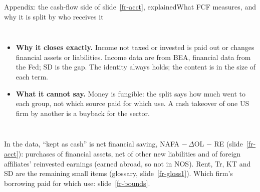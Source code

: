 \documentclass[aspectratio=169,10pt,t]{beamer}
\newcommand{\src}[1]{\vfill{\tiny\textcolor{muted}{#1}\par}\vspace{0.04cm}}
\newcommand{\slref}[1]{slide~\ref{#1}}
\begin{document}
\begin{frame}[label=xcash]{Appendix: the cash-flow side of \slref{fr-acct}, explained}{What FCF measures, and why it is split by who receives it}
\begin{columns}[T]
{\begin{itemize}
\item \textbf{Why it closes exactly.} Income not taxed or invested is paid out or changes financial assets or liabilities. Income data are from BEA, financial data from the Fed; SD is the gap. The identity always holds; the content is in the size of each term.
\item \textbf{What it cannot say.} Money is fungible: the split says how much went to each group, not which source paid for which use. A cash takeover of one US firm by another is a buyback for the sector.
\end{itemize}}
\end{columns}
\src{In the data, ``kept as cash'' is net financial saving, NAFA $-\,\Delta$OL $-$ RE (\slref{fr-acct}): purchases of financial assets, net of other new liabilities and of foreign affiliates' reinvested earnings (earned abroad, so not in NOS). Rent, Tr, KT and SD are the remaining small items (glossary, \slref{fr-gloss1}). Which firm's borrowing paid for which use: \slref{fr-bounds}.}
\end{frame}
\end{document}
